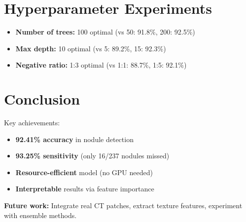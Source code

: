 \documentclass{article}
\begin{document}
\section{Hyperparameter Experiments}
\begin{itemize}
    \item \textbf{Number of trees:} 100 optimal (vs 50: 91.8\%, 200: 92.5\%)
    \item \textbf{Max depth:} 10 optimal (vs 5: 89.2\%, 15: 92.3\%)
    \item \textbf{Negative ratio:} 1:3 optimal (vs 1:1: 88.7\%, 1:5: 92.1\%)
\end{itemize}

\section{Conclusion}
Key achievements:
\begin{itemize}
    \item \textbf{92.41\% accuracy} in nodule detection
    \item \textbf{93.25\% sensitivity} (only 16/237 nodules missed)
    \item \textbf{Resource-efficient} model (no GPU needed)
    \item \textbf{Interpretable} results via feature importance
\end{itemize}

\textbf{Future work:} Integrate real CT patches, extract texture features, experiment with ensemble methods.
\end{document}
